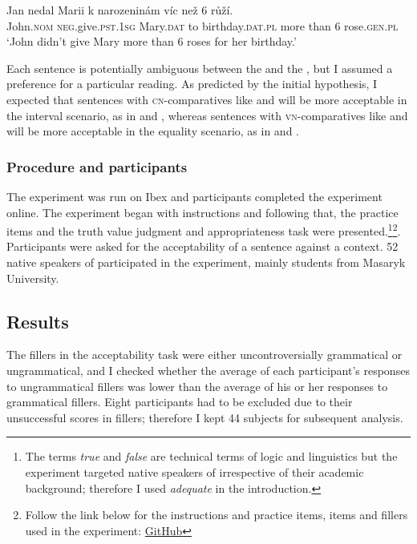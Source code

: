\documentclass[output=paper, colorlinks, citecolor=brown, newtxmath]{langsci/langscibook}
\begin{document}
\ea
\gll Jan nedal Marii k narozeninám víc než 6 růží.\label{ex:ovn}\\
John.\textsc{nom} \textsc{neg}.give.\textsc{pst.1sg} Mary.\textsc{dat} to birthday.\textsc{dat.pl} more than 6 rose.\textsc{gen.pl}\\\hfill{}
\glt`John didn't give Mary more than 6 roses for her birthday.'
\z


\noindent Each sentence is potentially ambiguous between the  and the , but I assumed a preference for a particular reading. As predicted by the initial hypothesis, I expected that sentences with \textsc{cn-}comparatives like  and  will be more acceptable in the interval scenario, as in  and , whereas sentences with \textsc{vn-}comparatives like  and  will be more acceptable in the equality scenario, as in  and .

\subsubsection{Procedure and participants}
The experiment was run on Ibex and participants completed the experiment online. The experiment began with instructions and following that, the practice items and the truth value judgment and appropriateness task were presented.\footnote{The terms \textit{true} and \textit{false} are technical terms of logic and linguistics but the experiment targeted native speakers of  irrespective of their academic background; therefore I used \textit{adequate} in the introduction.}\footnote{Follow the link below for the instructions and practice items, items and fillers used in the experiment: \href{https://github.com/ivetasafratova/Negation-comparative-and-alternatives-Experimental-evidence-from-Czech.git}{GitHub}}.
Participants were asked for the acceptability of a sentence against a context. 52 native speakers of  participated in the experiment, mainly students from Masaryk University.


\subsection{Results}
The fillers in the acceptability task were either uncontroversially grammatical or ungrammatical, and I checked whether the average of each participant’s responses to ungrammatical fillers was lower than the average of his or her responses to grammatical fillers. Eight participants had to be excluded due to their unsuccessful scores in fillers; therefore I kept 44 subjects for subsequent analysis.
\end{document}
